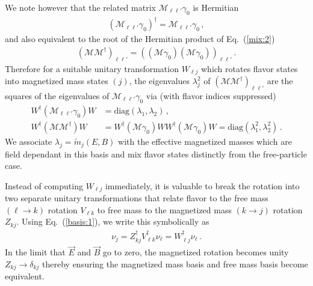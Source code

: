 \documentclass[addchapnum]{ws-rv961x669} %
\newcommand{\req}[1]{Eq.~(\ref{#1})}
\begin{document}
We note however that the related matrix $\mathcal{M}_{\ell\ell'}\gamma_{0}$ is Hermitian
\begin{align}
    \label{herm:1}
    (\mathcal{M}_{\ell\ell'}\gamma_{0})^{\dag} = \mathcal{M}_{\ell\ell'}\gamma_{0}\,,
\end{align}
and also equivalent to the root of the Hermitian product of \req{mix:2}
\begin{align}
    (\mathcal{M}\mathcal{M}^{\dag})_{\ell\ell'} = \left((\mathcal{M}\gamma_{0})(\mathcal{M}\gamma_{0})\right)_{\ell\ell'}\,.
\end{align}
Therefore for a suitable unitary transformation $W_{\ell j}$ which rotates flavor states into magnetized mass states $(j)$, the eigenvalues $\lambda_{j}^{2}$ of $(\mathcal{M}\mathcal{M}^{\dag})_{\ell\ell'}$ are the squares of the eigenvalues of $\mathcal{M}_{\ell\ell'}\gamma_{0}$ via (with flavor indices suppressed)
\begin{align}
    W^{\dag}(\mathcal{M}_{\ell\ell'}\gamma_{0})W &= \mathrm{diag}(\lambda_{1},\lambda_{2})\,,\\
    W^{\dag}(\mathcal{M}\mathcal{M}^{\dag})W &= W^{\dag}(\mathcal{M}\gamma_{0})WW^{\dag}(\mathcal{M}\gamma_{0})W = \mathrm{diag}(\lambda_{1}^{2},\lambda_{2}^{2})\,.
\end{align}
We associate $\lambda_{j}=\widetilde m_{j}(E,B)$ with the effective magnetized masses which are field dependant in this basis and mix flavor states distinctly from the free-particle case.

Instead of computing $W_{\ell j}$ immediately, it is valuable to break the rotation into two separate unitary transformations that relate flavor to the free mass $(\ell\rightarrow k)$ rotation $V_{\ell k}$ to free mass to the magnetized mass $(k\rightarrow j)$ rotation $Z_{kj}$. Using \req{basis:1}, we write this symbolically as
\begin{align}
    \nu_{j}=Z_{kj}^{\dag}V_{\ell k}^{\dag}\nu_{\ell} = W^{\dag}_{\ell j}\nu_{\ell}\,.
\end{align}
In the limit that $\vec{E}$ and $\vec{B}$ go to zero, the magnetized rotation becomes unity $Z_{kj}\rightarrow\delta_{kj}$ thereby ensuring the magnetized mass basis and free mass basis become equivalent.
\end{document}
